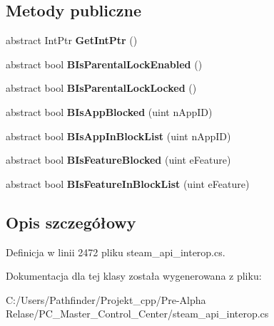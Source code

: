 \subsection*{Metody publiczne}
\begin{DoxyCompactItemize}
\item 
\mbox{\label{class_valve_1_1_steamworks_1_1_i_steam_parental_settings_a0f956f274bc7dbbef2baae7cdda00041}} 
abstract Int\+Ptr {\bfseries Get\+Int\+Ptr} ()
\item 
\mbox{\label{class_valve_1_1_steamworks_1_1_i_steam_parental_settings_a4f6dc2951c4f7868e483b4b17bf09190}} 
abstract bool {\bfseries B\+Is\+Parental\+Lock\+Enabled} ()
\item 
\mbox{\label{class_valve_1_1_steamworks_1_1_i_steam_parental_settings_a0fc2f8ff6c2bc53f8bf28c88e07b4469}} 
abstract bool {\bfseries B\+Is\+Parental\+Lock\+Locked} ()
\item 
\mbox{\label{class_valve_1_1_steamworks_1_1_i_steam_parental_settings_aee53452f03d155d829fc809cf5013f61}} 
abstract bool {\bfseries B\+Is\+App\+Blocked} (uint n\+App\+ID)
\item 
\mbox{\label{class_valve_1_1_steamworks_1_1_i_steam_parental_settings_a23c059d8c49b5616714b42d725d3601b}} 
abstract bool {\bfseries B\+Is\+App\+In\+Block\+List} (uint n\+App\+ID)
\item 
\mbox{\label{class_valve_1_1_steamworks_1_1_i_steam_parental_settings_a2a37312d17d15e45841da53aac04d0cd}} 
abstract bool {\bfseries B\+Is\+Feature\+Blocked} (uint e\+Feature)
\item 
\mbox{\label{class_valve_1_1_steamworks_1_1_i_steam_parental_settings_a49b77d4041ddd8bd0f05358d5831a717}} 
abstract bool {\bfseries B\+Is\+Feature\+In\+Block\+List} (uint e\+Feature)
\end{DoxyCompactItemize}


\subsection{Opis szczegółowy}


Definicja w linii 2472 pliku steam\+\_\+api\+\_\+interop.\+cs.



Dokumentacja dla tej klasy została wygenerowana z pliku\+:\begin{DoxyCompactItemize}
\item 
C\+:/\+Users/\+Pathfinder/\+Projekt\+\_\+cpp/\+Pre-\/\+Alpha Relase/\+P\+C\+\_\+\+Master\+\_\+\+Control\+\_\+\+Center/steam\+\_\+api\+\_\+interop.\+cs\end{DoxyCompactItemize}
